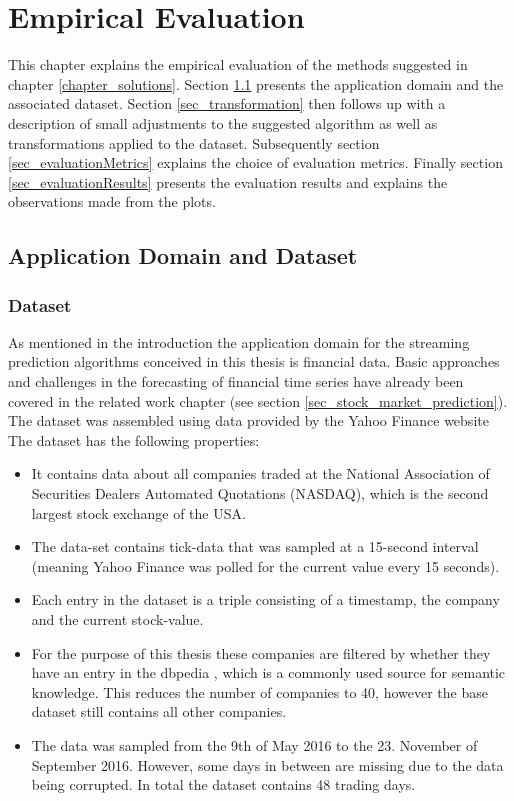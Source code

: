 \chapter{Empirical Evaluation}
\label{chapter_evaluation}

\ifpdf
    \graphicspath{{Chapter5/Figs/Raster/}{Chapter5/Figs/PDF/}{Chapter5/Figs/}}
\else
    \graphicspath{{Chapter5/Figs/Vector/}{Chapter5/Figs/}}
\fi

This chapter explains the empirical evaluation of the methods suggested in chapter \ref{chapter_solutions}. Section \ref{sec_applicationDomain} presents the application domain and the associated dataset. Section \ref{sec_transformation} then follows up with a description of small adjustments to the suggested algorithm as well as transformations applied to the dataset. Subsequently section \ref{sec_evaluationMetrics} explains the choice of evaluation metrics. Finally section \ref{sec_evaluationResults} presents the evaluation results and explains the observations made from the plots.

\section{Application Domain and Dataset}
\label{sec_applicationDomain}

\subsection{Dataset}
As mentioned in the introduction the application domain for the streaming prediction algorithms conceived in this thesis is financial data. Basic approaches and challenges in the forecasting of financial time series have already been covered in the related work chapter (see section \ref{sec_stock_market_prediction}). The dataset was assembled using data provided by the Yahoo Finance website \cite{yahooFinance} The dataset has the following properties:
\begin{itemize}
	\item It contains data about all companies traded at the National Association of Securities Dealers Automated Quotations (NASDAQ), which is the second largest stock exchange of the USA.
	\item The data-set contains tick-data that was sampled at a 15-second interval (meaning Yahoo Finance was polled for the current value every 15 seconds).
	\item Each entry in the dataset is a triple consisting of a timestamp, the company and the current stock-value.
	\item For the purpose of this thesis these companies are filtered by whether they have an entry in the dbpedia \cite{auer2007dbpedia}, which is a commonly used source for semantic knowledge. This reduces the number of companies to 40, however the base dataset still contains all other companies.
	\item The data was sampled from the 9th of May 2016 to the 23. November of September 2016. However, some days in between are missing due to the data being corrupted. In total the dataset contains 48 trading days.
\end{itemize}

